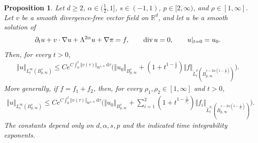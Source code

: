 \documentclass[reqno,11pt,a4paper]{amsart}
\newtheorem{proposition}[theorem]{Proposition}
\newcommand{\dd}{\mathrm{d}}
\renewcommand{\div}{{\rm div\,}}
\begin{document}
\begin{proposition}\label{prop-linear-velocity-eqn}
Let $d\geq2$, $\alpha\in(\tfrac12,1]$, $s\in(-1,1)$,
$p\in[2,\infty)$, and $\rho\in[1,\infty]$.
Let $v$ be a smooth divergence-free vector field on
$\mathbb R^d$, and let $u$ be a smooth solution of
\begin{equation}\label{eq:LB}
  \partial_t u+v\cdot\nabla u+\Lambda^{2\alpha}u
  +\nabla \pi=f,
  \qquad
  \div u=0,
  \qquad
  u|_{t=0}=u_0.
\end{equation}
Then, for every $t>0$,
\begin{equation}\label{es:linear-velocity-eqn}
\begin{aligned}
  \Vert u\Vert _{L^\infty_t(B^s_{p,\infty})}
  \leq
  Ce^{C\int_0^t\Vert v(\tau)\Vert _{W^{1,\infty}}\,\dd\tau}
  \bigg(
    \Vert u_0\Vert _{B^s_{p,\infty}}
    +(1+t^{1-\frac1\rho})
    \Vert f\Vert _{\widetilde L^\rho_t
      (B^{s-2\alpha(1-\frac1\rho)}_{p,\infty})}
  \bigg).
\end{aligned}
\end{equation}
More generally, if $f=f_1+f_2$, then, for every
$\rho_1,\rho_2\in[1,\infty]$ and $t>0$,
\begin{equation}\label{es:linear-velocity-eqn-2}
\begin{aligned}
  \Vert u\Vert _{L^\infty_t(B^s_{p,\infty})}
  \leq
  Ce^{C\int_0^t\Vert v(\tau)\Vert _{W^{1,\infty}}\,\dd\tau}
  \bigg(
    \Vert u_0\Vert _{B^s_{p,\infty}}
    +\sum_{i=1}^2
    (1+t^{1-\frac1{\rho_i}})
    \Vert f_i\Vert _{\widetilde L^{\rho_i}_t
      (B^{s-2\alpha(1-\frac1{\rho_i})}_{p,\infty})}
  \bigg).
\end{aligned}
\end{equation}
The constants depend only on $d,\alpha,s,p$
and the indicated time integrability exponents.
\end{proposition}
\end{document}
